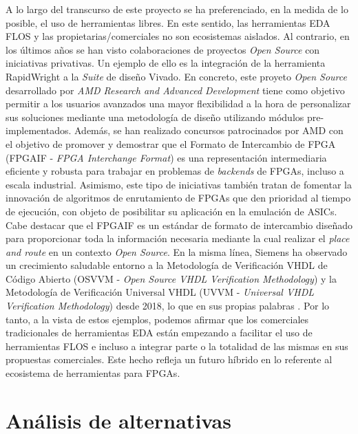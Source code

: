 A lo largo del transcurso de este proyecto se ha preferenciado, en la medida de lo posible, el uso de herramientas libres.
En este sentido, las herramientas EDA FLOS y las propietarias/comerciales no son ecosistemas aislados.
Al contrario, en los últimos años se han visto colaboraciones de proyectos \textit{Open Source} con iniciativas privativas.
Un ejemplo de ello es la integración de la herramienta RapidWright \cite{gh:rapid} a la \textit{Suite} de diseño Vivado.
En concreto, este proyeto \textit{Open Source} desarrollado por \textit{AMD Research and Advanced Development} tiene como objetivo permitir a los usuarios avanzados una mayor flexibilidad a la hora de personalizar sus soluciones mediante una metodología de diseño utilizando módulos pre-implementados.
Además, se han realizado concursos \cite{contest} patrocinados por AMD con el objetivo de promover y demostrar que el Formato de Intercambio de FPGA (FPGAIF - \textit{FPGA Interchange Format}) \cite{FPGAIF} es una representación intermediaria eficiente y robusta para trabajar en problemas de \textit{backends} de FPGAs, incluso a escala industrial.
Asimismo, este tipo de iniciativas también tratan de fomentar la innovación de algoritmos de enrutamiento de FPGAs que den prioridad al tiempo de ejecución, con objeto de posibilitar su aplicación en la emulación de ASICs.
Cabe destacar que el FPGAIF es un estándar de formato de intercambio diseñado para proporcionar toda la información necesaria mediante la cual realizar el \textit{place and route} en un contexto \textit{Open Source}.
En la misma línea, Siemens ha observado un crecimiento saludable entorno a la Metodología de Verificación VHDL de Código Abierto (OSVVM - \textit{Open Source VHDL Verification Methodology}) \cite{osvvm} y la Metodología de Verificación Universal VHDL (UVVM - \textit{Universal VHDL Verification Methodology}) \cite{uvvm} desde 2018, lo que en sus propias palabras  \cite{wilson-research}.
Por lo tanto, a la vista de estos ejemplos, podemos afirmar que los comerciales tradicionales de herramientas EDA están empezando a facilitar el uso de herramientas FLOS e incluso a integrar parte o la totalidad de las mismas en sus propuestas comerciales.
Este hecho refleja un futuro híbrido en lo referente al ecosistema de herramientas para FPGAs.

\section{Análisis de alternativas}

